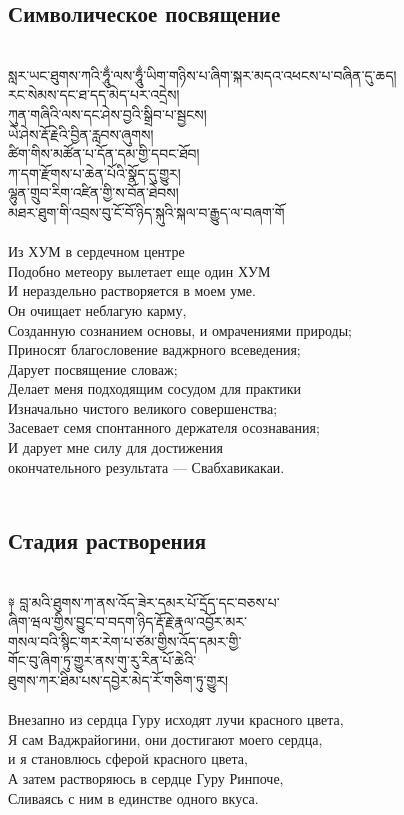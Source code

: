 \newpage
\subsection{Символическое посвящение}
\\
\ti
སླར་ཡང་ཐུགས་ཀའི་ཧཱུྂ་ལས་ཧཱུྂ་ཡིག་གཉིས་པ་ཞིག་སྐར་མདའ་འཕངས་པ་བཞིན་དུ་ཆད།\\
རང་སེམས་དང་ཐ་དད་མེད་པར་འདྲེས།\\
ཀུན་གཞིའི་ལས་དང་ཤེས་བྱའི་སྒྲིབ་པ་སྦྱངས།\\
ཡེ་ཤེས་རྡོ་རྗེའི་བྱིན་རླབས་ཞུགས།\\
ཚིག་གིས་མཚོན་པ་དོན་དམ་གྱི་དབང་ཐོབ།\\
ཀ་དག་རྫོགས་པ་ཆེན་པོའི་སྣོད་དུ་གྱུར།\\
ལྷུན་གྲུབ་རིག་འཛིན་གྱི་ས་བོན་ཐེབས།\\
མཐར་ཐུག་གི་འབྲས་བུ་ངོ་བོ་ཉིད་སྐུའི་སྐལ་བ་རྒྱུད་ལ་བཞག་གོ\\
\\
\ru
Из ХУМ в сердечном центре\\
Подобно метеору вылетает еще один ХУМ\\
И нераздельно растворяется в моем уме.\\
Он очищает неблагую карму,\\
Созданную сознанием основы, и омрачениями природы;\\
Приносят благословение ваджрного всеведения;\\
Дарует посвящение словаж;\\
Делает меня подходящим сосудом для практики\\
Изначально чистого великого совершенства;\\
Засевает семя спонтанного держателя осознавания;\\
И дарует мне силу для достижения\\
окончательного результата — Свабхавикакаи.\\
\\
\newpage
\subsection{Стадия растворения}
\\
\ti
༈ བླ་མའི་ཐུགས་ཀ་ནས་འོད་ཟེར་དམར་པོ་དྲོད་དང་བཅས་པ་\\
ཞིག་ཝལ་གྱིས་བྱུང་བ་བདག་ཉིད་རྡོ་རྗེ་རྣལ་འབྱོར་མར་\\
གསལ་བའི་སྙིང་གར་རེག་པ་ཙམ་གྱིས་འོད་དམར་གྱི་\\
གོང་བུ་ཞིག་ཏུ་གྱུར་ནས་གུ་རུ་རིན་པོ་ཆེའི་\\
ཐུགས་ཀར་ཐིམ་པས་དབྱེར་མེད་རོ་གཅིག་ཏུ་གྱུར།\\
\\
\ru
Внезапно из сердца Гуру исходят лучи красного цвета,\\
Я сам Ваджрайогини, они достигают моего сердца,\\
и я становлюсь сферой красного цвета,\\
А затем растворяюсь в сердце Гуру Ринпоче,\\
Сливаясь с ним в единстве одного вкуса.\\
